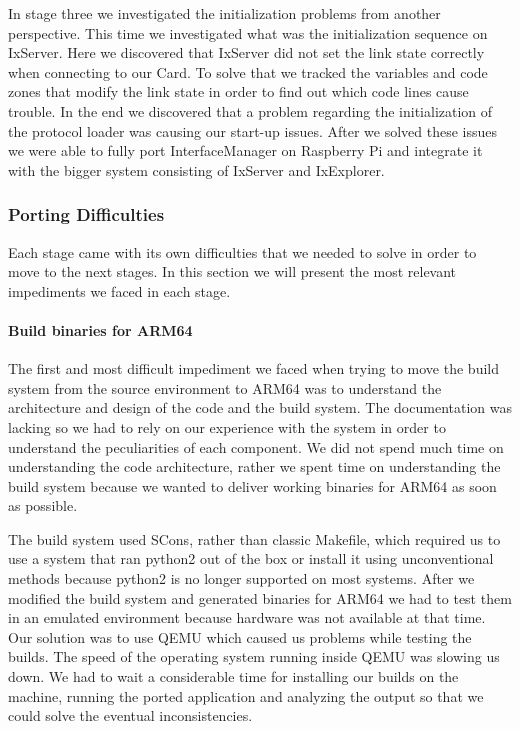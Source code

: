 In stage three we investigated the initialization problems from another
perspective. This time we investigated what was the initialization sequence on
IxServer. Here we discovered that IxServer did not set the link state correctly
when connecting to our Card. To solve that we tracked the variables and code
zones that modify the link state in order to find out which code lines cause
trouble. In the end we discovered that a problem regarding the initialization
of the protocol loader was causing our start-up issues. After we solved
these issues we were able to fully port InterfaceManager on Raspberry Pi and
integrate it with the bigger system consisting of IxServer and IxExplorer.

\subsubsection{Porting Difficulties}

Each stage came with its own difficulties that we needed to solve in order to
move to the next stages. In this section we will present the most relevant
impediments we faced in each stage.

\paragraph{Build binaries for ARM64}

The first and most difficult impediment we faced when trying to move the build
system from the source environment to ARM64 was to understand the architecture
and design of the code and the build system. The documentation was lacking so
we had to rely on our experience with the system in order to understand the
peculiarities of each component. We did not spend much time on understanding the
code architecture, rather we spent time on understanding the build system
because we wanted to deliver working binaries for ARM64 as soon as possible.

The build system used SCons, rather than classic Makefile, which required us to
use a system that ran python2 out of the box or install it using unconventional
methods because python2 is no longer supported on most systems. After we
modified the build system and generated binaries for ARM64 we had to test them
in an emulated environment because hardware was not available at that time. Our
solution was to use QEMU which caused us problems while testing the builds.
The speed of the operating system running inside QEMU was slowing us down. We
had to wait a considerable time for installing our builds on the
machine, running the ported application and analyzing the output so that we
could solve the eventual inconsistencies.

